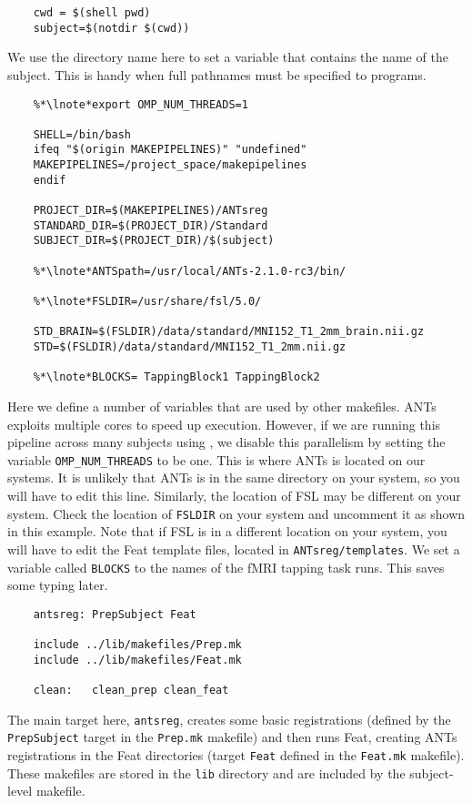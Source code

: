 \begin{lstlisting}
	cwd = $(shell pwd)
	subject=$(notdir $(cwd))
\end{lstlisting}
We use the directory name here to set a variable that contains the
name of the subject. This is handy when full pathnames must be
specified to programs. 

\begin{lstlisting}
	%*\lnote*export OMP_NUM_THREADS=1

	SHELL=/bin/bash
	ifeq "$(origin MAKEPIPELINES)" "undefined"
	MAKEPIPELINES=/project_space/makepipelines
	endif

	PROJECT_DIR=$(MAKEPIPELINES)/ANTsreg
	STANDARD_DIR=$(PROJECT_DIR)/Standard
	SUBJECT_DIR=$(PROJECT_DIR)/$(subject)

	%*\lnote*ANTSpath=/usr/local/ANTs-2.1.0-rc3/bin/

	%*\lnote*FSLDIR=/usr/share/fsl/5.0/

	STD_BRAIN=$(FSLDIR)/data/standard/MNI152_T1_2mm_brain.nii.gz
	STD=$(FSLDIR)/data/standard/MNI152_T1_2mm.nii.gz

	%*\lnote*BLOCKS= TappingBlock1 TappingBlock2
\end{lstlisting}

Here we define a number of variables that are used by other
makefiles.  ANTs exploits multiple cores to speed up
execution. However, if we are running this pipeline across many
subjects using \maken{}, we disable this parallelism by setting the
variable \texttt{OMP_NUM_THREADS} to be one.  This is where
ANTs is located on our systems. It is unlikely that ANTs is in the
same directory on your system, so you will have to edit this line.
 Similarly, the location of FSL may be different on your
system. Check the location of \texttt{FSLDIR} on your system and
uncomment it as shown in this example. Note that if FSL is in a
different location on your system, you will have to edit the Feat template files, located in
\texttt{ANTsreg/templates}.  We set a variable
called \texttt{BLOCKS} to the names of the fMRI tapping task
runs. This saves some typing later.

\begin{lstlisting}
	antsreg: PrepSubject Feat

	include ../lib/makefiles/Prep.mk
	include ../lib/makefiles/Feat.mk

	clean:	 clean_prep clean_feat 
\end{lstlisting}
The main target here, \texttt{antsreg}, creates some basic
registrations (defined by the \texttt{PrepSubject} target in the
\texttt{Prep.mk} makefile) and then runs Feat, creating ANTs
registrations in the Feat directories (target \texttt{Feat} defined in
the \texttt{Feat.mk} makefile). These makefiles are stored in the
\texttt{lib} directory and are included by the subject-level makefile.

